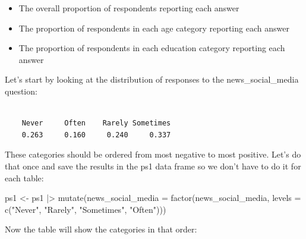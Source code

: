 \documentclass[
  letterpaper,
  DIV=11,
  numbers=noendperiod]{scrartcl}
\newenvironment{Shaded}{\begin{snugshade}}{\end{snugshade}}
\newcommand{\AttributeTok}[1]{\textcolor[rgb]{0.40,0.45,0.13}{#1}}
\newcommand{\DecValTok}[1]{\textcolor[rgb]{0.68,0.00,0.00}{#1}}
\newcommand{\FunctionTok}[1]{\textcolor[rgb]{0.28,0.35,0.67}{#1}}
\newcommand{\NormalTok}[1]{\textcolor[rgb]{0.00,0.23,0.31}{#1}}
\newcommand{\OtherTok}[1]{\textcolor[rgb]{0.00,0.23,0.31}{#1}}
\newcommand{\SpecialCharTok}[1]{\textcolor[rgb]{0.37,0.37,0.37}{#1}}
\newcommand{\StringTok}[1]{\textcolor[rgb]{0.13,0.47,0.30}{#1}}
\providecommand{\tightlist}{%
  \setlength{\itemsep}{0pt}\setlength{\parskip}{0pt}}\usepackage{longtable,booktabs,array}
\begin{document}
\begin{itemize}
\tightlist
\item
  The overall proportion of respondents reporting each answer
\item
  The proportion of respondents in each age category reporting each
  answer
\item
  The proportion of respondents in each education category reporting
  each answer
\end{itemize}

Let's start by looking at the distribution of responses to the
news\_social\_media question:

\begin{Shaded}
\end{Shaded}

\begin{verbatim}

    Never     Often    Rarely Sometimes 
    0.263     0.160     0.240     0.337 
\end{verbatim}

These categories should be ordered from most negative to most positive.
Let's do that once and save the results in the ps1 data frame so we
don't have to do it for each table:

\begin{Shaded}
\begin{Highlighting}[]
\NormalTok{ps1 }\OtherTok{\textless{}{-}}\NormalTok{ ps1 }\SpecialCharTok{|\textgreater{}} 
  \FunctionTok{mutate}\NormalTok{(}\AttributeTok{news\_social\_media =} \FunctionTok{factor}\NormalTok{(news\_social\_media,}
                                    \AttributeTok{levels =} \FunctionTok{c}\NormalTok{(}\StringTok{"Never"}\NormalTok{,}
                                               \StringTok{"Rarely"}\NormalTok{,}
                                               \StringTok{"Sometimes"}\NormalTok{,}
                                               \StringTok{"Often"}\NormalTok{)))}
\end{Highlighting}
\end{Shaded}

Now the table will show the categories in that order:

\begin{Shaded}
\end{Shaded}
\end{document}
